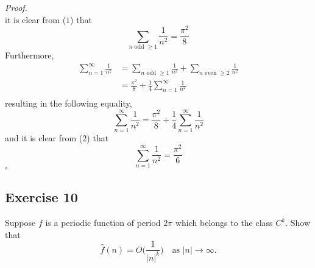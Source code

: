 \documentclass[12pt]{article}
\newenvironment{proof}{\textit{Proof.}}{\hfill$\square$}
\begin{document}
\begin{enumerate}[(a)]
\begin{proof}
\begin{equation}
        \end{equation}
        it is clear from ($1$) that
        \begin{equation*}
            \sum_{n\text{ odd }\ge1}\frac{1}{n^2}=\frac{\pi^2}{8}
        \end{equation*}
        Furthermore,
        \begin{align*}
            \sum_{n=1}^{\infty}\frac{1}{n^2} &= \sum_{n\text{ odd }\ge1}\frac{1}{n^2} + \sum_{n\text{ even }\ge2}\frac{1}{n^2} \\
            &= \frac{\pi^2}{8} + \frac{1}{4}\sum_{n=1}^{\infty}\frac{1}{n^2} \\
        \end{align*}
        resulting in the following equality,
        \begin{equation}
            \sum_{n=1}^{\infty}\frac{1}{n^2}=\frac{\pi^2}{8} + \frac{1}{4}\sum_{n=1}^{\infty}\frac{1}{n^2}
        \end{equation}
        and it is clear from ($2$) that 
        \begin{equation*}
            \sum_{n=1}^{\infty}\frac{1}{n^2} = \frac{\pi^2}{6}
        \end{equation*}
    \end{proof}
\end{enumerate}
\newpage
\setcounter{equation}{0}

\subsection*{Exercise 10}
Suppose $f$ is a periodic function of period $2\pi$ which belongs to the class $C^k$. Show that
\begin{equation}
    \hat{f}(n)=O\Bigg(\frac{1}{|n|^k}\Bigg)\hspace{1em}\text{as }|n|\to\infty.
\end{equation}
\end{document}
